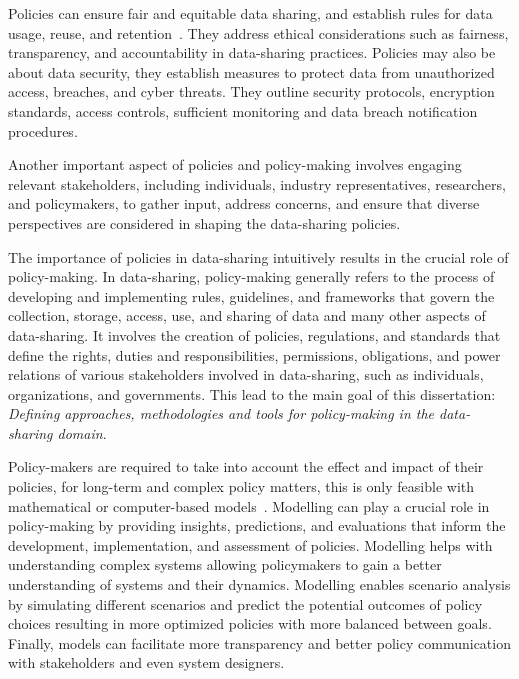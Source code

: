 Policies can ensure fair and equitable data sharing, and establish rules for data usage, reuse, and retention~\cite{nissenbaum2004privacy}. They address ethical considerations such as fairness, transparency, and accountability in data-sharing practices. Policies may also be about data security, they establish measures to protect data from unauthorized access, breaches, and cyber threats. They outline security protocols, encryption standards, access controls, sufficient monitoring and data breach notification procedures. 

Another important aspect of policies and policy-making involves engaging relevant stakeholders, including individuals, industry representatives, researchers, and policymakers, to gather input, address concerns, and ensure that diverse perspectives are considered in shaping the data-sharing policies.


The importance of policies in data-sharing intuitively results in the crucial role of policy-making. In data-sharing, policy-making generally refers to the process of developing and implementing rules, guidelines, and frameworks that govern the collection, storage, access, use, and sharing of data and many other aspects of data-sharing. It involves the creation of policies, regulations, and standards that define the rights, duties and responsibilities, permissions, obligations, and power relations of various stakeholders involved in data-sharing, such as individuals, organizations, and governments. This lead to the main goal of this dissertation: \textit{Defining approaches, methodologies and tools for policy-making in the data-sharing domain}.

Policy-makers are required to take into account the effect and impact of their policies, for long-term and complex policy matters, this is only feasible with mathematical or computer-based models~\cite{Boulanger2005}. Modelling can play a crucial role in policy-making by providing insights, predictions, and evaluations that inform the development, implementation, and assessment of policies. Modelling helps with understanding complex systems allowing policymakers to gain a better understanding of systems and their dynamics. Modelling enables scenario analysis by simulating different scenarios and predict the potential outcomes of policy choices resulting in more optimized policies with more balanced between goals. Finally, models can facilitate more transparency and better policy communication with stakeholders and even system designers.

